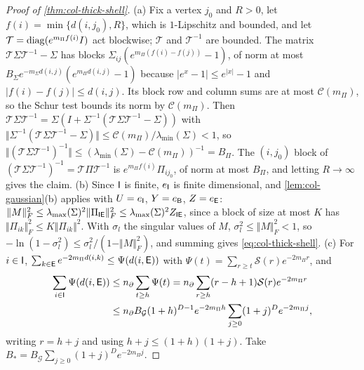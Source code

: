 \begin{proof}[Proof of \cref{thm:col-thick-shell}]
(a) Fix a vertex $j_0$ and $R>0$, let $f(i)=\min\{d(i,j_0),R\}$, which is $1$-Lipschitz and bounded, and let $\mathcal T=\operatorname{diag}(e^{m_\Pi f(i)}I)$ act blockwise; $\mathcal T$ and $\mathcal T^{-1}$ are bounded. The matrix $\mathcal T\Sigma\mathcal T^{-1}-\Sigma$ has blocks $\Sigma_{ij}(e^{m_\Pi(f(i)-f(j))}-1)$, of norm at most $B_\Sigma e^{-m_\Sigma d(i,j)}(e^{m_\Pi d(i,j)}-1)$ because $|e^x-1|\le e^{|x|}-1$ and $|f(i)-f(j)|\le d(i,j)$. Its block row and column sums are at most $\mathcal C(m_\Pi)$, so the Schur test bounds its norm by $\mathcal C(m_\Pi)$. Then $\mathcal T\Sigma\mathcal T^{-1}=\Sigma(I+\Sigma^{-1}(\mathcal T\Sigma\mathcal T^{-1}-\Sigma))$ with $\Vert\Sigma^{-1}(\mathcal T\Sigma\mathcal T^{-1}-\Sigma)\Vert\le\mathcal C(m_\Pi)/\lambda_{\min}(\Sigma)<1$, so $\Vert(\mathcal T\Sigma\mathcal T^{-1})^{-1}\Vert\le(\lambda_{\min}(\Sigma)-\mathcal C(m_\Pi))^{-1}=B_\Pi$. The $(i,j_0)$ block of $(\mathcal T\Sigma\mathcal T^{-1})^{-1}=\mathcal T\Pi\mathcal T^{-1}$ is $e^{m_\Pi f(i)}\Pi_{ij_0}$, of norm at most $B_\Pi$, and letting $R\to\infty$ gives the claim. (b) Since $\mathsf{I}$ is finite, $e_{\mathsf{I}}$ is finite dimensional, and \cref{lem:col-gaussian}(b) applies with $U=e_{\mathsf{I}}$, $Y=e_{\mathsf{B}}$, $Z=e_{\mathsf{E}}$: $\Vert M\Vert_F^2\le\lambda_{\max}(\Sigma)^2\Vert\Pi_{\mathsf{I}\mathsf{E}}\Vert_F^2\le\lambda_{\max}(\Sigma)^2Z_{\mathsf{I}\mathsf{E}}$, since a block of size at most $K$ has $\Vert\Pi_{ik}\Vert_F^2\le K\Vert\Pi_{ik}\Vert^2$. With $\sigma_l$ the singular values of $M$, $\sigma_l^2\le\Vert M\Vert_F^2<1$, so $-\ln(1-\sigma_l^2)\le\sigma_l^2/(1-\Vert M\Vert_F^2)$, and summing gives \eqref{eq:col-thick-shell}. (c) For $i\in\mathsf{I}$, $\sum_{k\in\mathsf{E}}e^{-2m_\Pi d(i,k)}\le\Psi(d(i,\mathsf{E}))$ with $\Psi(t)=\sum_{r\ge t}\mathcal S(r)e^{-2m_\Pi r}$, and
\begin{align*}
\sum_{i\in\mathsf{I}}\Psi(d(i,\mathsf{E}))&\le n_\partial\sum_{t\ge h}\Psi(t)=n_\partial\sum_{r\ge h}(r-h+1)\mathcal S(r)e^{-2m_\Pi r}\\
&\le n_\partial B_{\mathcal G}(1+h)^{D-1}e^{-2m_\Pi h}\sum_{j\ge0}(1+j)^De^{-2m_\Pi j},
\end{align*}
writing $r=h+j$ and using $h+j\le(1+h)(1+j)$. Take $B_*=B_{\mathcal G}\sum_{j\ge0}(1+j)^De^{-2m_\Pi j}$.
\end{proof}

